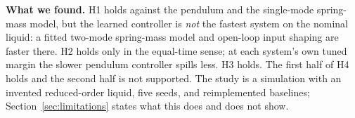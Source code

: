 \textbf{What we found.} H1 holds against the pendulum and the single-mode spring-mass model, but the learned controller is \emph{not} the fastest system on the nominal liquid: a fitted two-mode spring-mass model and open-loop input shaping are faster there. H2 holds only in the equal-time sense; at each system's own tuned margin the slower pendulum controller spills less. H3 holds. The first half of H4 holds and the second half is not supported. The study is a simulation with an invented reduced-order liquid, five seeds, and reimplemented baselines; Section~\ref{sec:limitations} states what this does and does not show.
